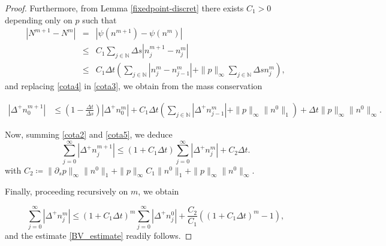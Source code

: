 \documentclass[11pt,a4paper]{article}
\newcommand{\N}{\mathbb{N}}
\begin{document}
\begin{proof}
Furthermore, from Lemma \ref{fixedpoint-discret} there exists $C_1>0$ depending only on $p$ such that
\begin{eqnarray}
 |N^{m+1}- N^m| 
 &=&
 \left| \psi(n^{m+1})-\psi(n^{m})\right|\nonumber\\
 &\le&
 C_1 \sum_{j\in\N} \Delta s | n_j^{m+1}-n_j^m|
 \nonumber\\
  &\le&
  C_1\Delta t\left(  \sum_{j\in\N} | n_j^{m}-n_{j-1}^m|  + \|p\|_\infty \sum_{j\in\N}  \Delta s n_j^m \right),\label{cota4}
 \end{eqnarray}
 and replacing \eqref{cota4} in \eqref{cota3}, we obtain from the mass conservation

\begin{equation}
\label{cota5}
    \begin{split}
       |\Delta^{+}n_0^{m+1}| & \le \left( 1 - \frac{\Delta t}{\Delta s} \right)  |\Delta^{+}n_0^{m}|
 + C_1\Delta t
  \left( \sum_{j\in\N}|\Delta^{+}n^m_{j-1}| + \|p\|_\infty \|n^0\|_1  \right)+ \Delta t \|p\|_\infty\|n^0\|_\infty.
    \end{split}
\end{equation}
 
Now, summing \eqref{cota2} and \eqref{cota5}, we deduce
\begin{equation}
 \sum_{j=0}^\infty|\Delta^{+}n_j^{m+1}|\le 
\left( 1 + 
 C_1\Delta t \right)
\sum_{j=0}^\infty|\Delta^{+}n_j^{m}|
+ C_2\Delta t.
\label{cota6}   
\end{equation}
with $C_2\coloneqq \|\partial_s p\|_\infty\|n^0\|_1+\|p\|_\infty C_1\|n^0\|_1+\|p\|_\infty\|n^0\|_\infty$.

Finally, proceeding recursively on $m$, we obtain

\begin{equation*}
\sum_{j=0}^\infty|\Delta^{+}n_j^m|\le (1+C_1\Delta t)^{m}\sum_{j=0}^\infty|\Delta^{+}n_j^{0}|+\frac{C_2}{C_1}\left((1+C_1\Delta t)^{m}-1\right),
\end{equation*}
and the estimate \eqref{BV_estimate} readily follows.
\end{proof}
\end{document}
